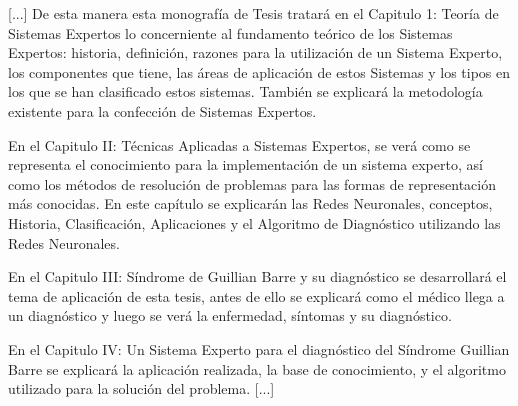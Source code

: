 \documentclass[preprint,12pt,notitlepage]{elsarticle}
\begin{document}
[...] De esta manera esta monografía de Tesis tratará en el Capitulo 1: Teoría de Sistemas Expertos lo concerniente al fundamento teórico de los Sistemas Expertos: historia, definición, razones para la utilización de un Sistema Experto, los componentes que tiene, las áreas de aplicación de estos Sistemas y los tipos en los que se han clasificado estos sistemas. También se explicará la metodología existente para la confección de Sistemas Expertos.

En el Capitulo II: Técnicas Aplicadas a Sistemas Expertos, se verá como se representa el conocimiento para la implementación de un sistema experto, así como los métodos de resolución de problemas para las formas de representación más conocidas. En este capítulo se explicarán las Redes Neuronales, conceptos, Historia, Clasificación, Aplicaciones y el Algoritmo de Diagnóstico utilizando las Redes Neuronales.

En el Capitulo III: Síndrome de Guillian Barre y su diagnóstico se desarrollará el tema de aplicación de esta tesis, antes de ello se explicará como el médico llega a un diagnóstico y luego se verá la enfermedad, síntomas y su diagnóstico.

En el Capitulo IV: Un Sistema Experto para el diagnóstico del Síndrome Guillian Barre se explicará la aplicación realizada, la base de conocimiento, y el algoritmo utilizado para la solución del problema. [...]
\end{document}
